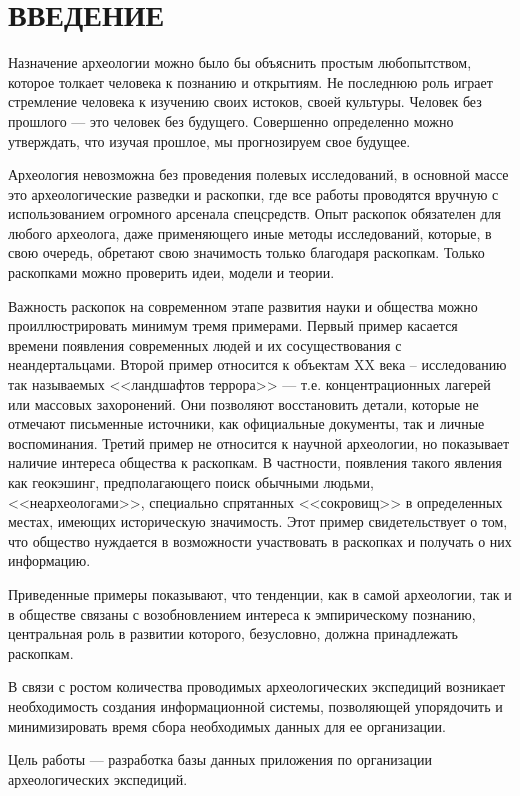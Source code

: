 \section*{ВВЕДЕНИЕ}
Назначение археологии можно было бы объяснить простым любопытством, 
которое толкает человека к познанию и открытиям. Не последнюю роль играет 
стремление человека к изучению своих истоков, своей культуры. Человек без прошлого --- это человек без будущего. Совершенно определенно можно утверждать, что изучая прошлое, мы прогнозируем свое будущее. 

Археология невозможна без проведения полевых исследований, в основной массе 
это археологические разведки и раскопки, где все работы проводятся вручную с 
использованием огромного арсенала спецсредств. Опыт раскопок обязателен для любого археолога, даже применяющего иные методы исследований, которые, в свою очередь, обретают свою значимость только благодаря раскопкам. Только раскопками можно проверить идеи, модели и теории.

Важность раскопок на современном этапе развития науки и общества можно 
проиллюстрировать минимум тремя примерами. Первый пример касается времени 
появления современных людей и их сосуществования с неандертальцами. Второй пример относится к объектам XX века – исследованию так называемых <<ландшафтов террора>> --- т.е. концентрационных лагерей или массовых захоронений. Они позволяют восстановить детали, которые не отмечают письменные источники, как официальные документы, так и личные воспоминания. Третий пример не относится к научной археологии, но показывает наличие интереса общества к раскопкам. В частности, появления такого явления как геокэшинг, предполагающего поиск обычными людьми, <<неархеологами>>, специально спрятанных <<сокровищ>> в определенных местах, имеющих историческую значимость. 
Этот пример свидетельствует о том, что общество нуждается в возможности участвовать в раскопках и получать о них информацию.

Приведенные примеры показывают, что тенденции, как в самой археологии, так и в обществе связаны с возобновлением интереса к эмпирическому познанию, центральная роль в развитии которого, безусловно, должна принадлежать раскопкам.

В связи с ростом количества проводимых археологических экспедиций возникает 
необходимость создания информационной системы, позволяющей упорядочить и 
минимизировать время сбора необходимых данных для ее организации.

Цель работы --- разработка базы данных приложения по организации археологических экспедиций.

